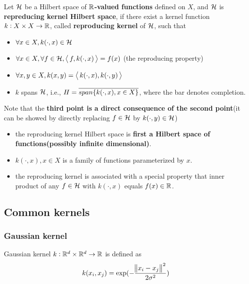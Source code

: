 \begin{refsection}
\begin{definition}
	Let $\mathcal{H}$ be a Hilbert space of \textbf{$\mathbb{R}$-valued functions} defined on $X$, and $\mathcal{H}$ is \textbf{repreducing kernel Hilbert space}, if there exist a kernel function $k:X\times X\to \mathbb{R}$, called \textbf{reproducing kernel} of $\mathcal{H}$, such that
	\begin{itemize}
		\item $\forall x \in X, k(\cdot,x) \in \mathcal{H}$
		\item $\forall x \in X,\forall f \in \mathcal{H}, {\left< \, f,k(\cdot,x) \, \right>} = f(x)$ (the reproducing property)
		\item $\forall x,y \in X, k(x,y) = {\left< \, k(\cdot,x),k(\cdot,y) \, \right>}$
		\item $k$ spans $\mathcal{H}$, i.e., $H = \overline{span\{k(\cdot,x),x\in X\}}$, where the bar denotes completion.
	\end{itemize}
\end{definition}

\begin{remark}
	Note that the \textbf{third point is a direct consequence of the second point}(it can be showed by directly replacing $f\in \mathcal{H}$ by $k(\cdot,y) \in \mathcal{H}$)
\end{remark}



\begin{remark}
	\begin{itemize}
		\item the reproducing kernel Hilbert space is \textbf{first a Hilbert space of functions(possibly infinite dimensional)}.
		\item $k(\cdot,x),x\in X$ is a family of functions parameterized by $x$.
		\item the reproducing kernel is associated with a special property that inner product of any $f\in \mathcal{H}$ with $k(\cdot,x)$ equals $f(x) \in \mathbb{R}$. 
	\end{itemize}
\end{remark}


\subsection{Common kernels}
\subsubsection{Gaussian kernel}
\begin{definition}
	\cite[482]{murphy2012machine}Gaussian kernel $k:\mathbb{R}^d\times \mathbb{R}^d \to \mathbb{R}$ is defined as
	$$k(x_i,x_j) = \exp(-\frac{\norm{x_i-x_j}^2}{2\sigma^2})$$
\end{definition}



\end{refsection}
